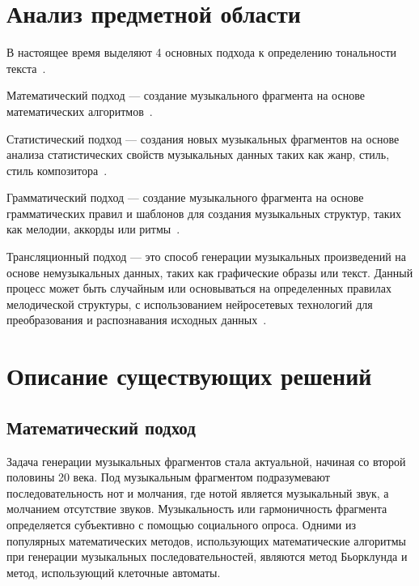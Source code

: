 \chapter{Анализ предметной области}

В настоящее время выделяют 4 основных подхода к определению тональности текста~\cite{big}.

Математический подход --- создание музыкального фрагмента на основе математических алгоритмов~\cite{chew_mathematical_computational_modeling}.

Статистический подход --- создания новых музыкальных фрагментов на основе анализа статистических свойств музыкальных данных таких как жанр, стиль, стиль композитора~\cite{conklin_music_generation}.

Грамматический подход --- создание музыкального фрагмента на основе грамматических правил и шаблонов для создания музыкальных структур, таких как мелодии, аккорды или ритмы~\cite{grammer}.

Трансляционный подход --- это способ генерации музыкальных произведений на основе немузыкальных данных, таких как графические образы или текст.
Данный процесс может быть случайным или основываться на определенных правилах мелодической структуры, с использованием нейросетевых технологий для преобразования и распознавания исходных данных~\cite{translation}.

\chapter{Описание существующих решений}

\section{Математический подход}

Задача генерации музыкальных фрагментов стала актуальной, начиная со второй половины 20 века. Под музыкальным фрагментом подразумевают последовательность нот и молчания, где нотой является музыкальный звук, а молчанием отсутствие звуков. Музыкальность или гармоничность фрагмента определяется субъективно с помощью социального опроса. Одними из популярных математических методов, использующих математические алгоритмы при генерации музыкальных последовательностей, являются метод Бьорклунда и метод, использующий клеточные автоматы.

